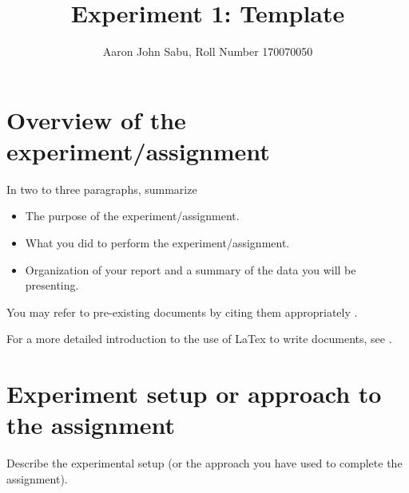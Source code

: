 \documentclass[12pt]{article}
\title{Experiment 1: Template}
\author{Aaron John Sabu, Roll Number 170070050}
\begin{document}
\maketitle

\section{Overview of the experiment/assignment}

In two to three paragraphs, summarize 
\begin{itemize}
\item The purpose of the experiment/assignment.
\item What you did to perform the experiment/assignment.
\item Organization of your report and a summary of the
data you will be presenting.
\end{itemize}

You may refer to pre-existing documents by
citing them appropriately \cite{ref:Ramayana}.

For a more detailed introduction to the use of
LaTex to write documents, see \cite{ref:LatexTutorial}.

\section{Experiment setup or approach to the assignment}

Describe the experimental setup (or the approach you have used
to complete the assignment).
\end{document}
